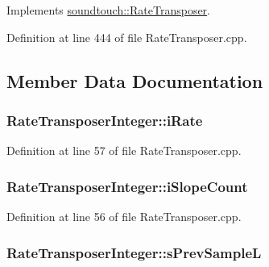 Implements \hyperlink{classsoundtouch_1_1_rate_transposer_a876bc124bc050d06473f58a24e5134d3}{soundtouch\+::\+Rate\+Transposer}.



Definition at line 444 of file Rate\+Transposer.\+cpp.



\subsection{Member Data Documentation}
\subsubsection[{\texorpdfstring{i\+Rate}{iRate}}]{ Rate\+Transposer\+Integer\+::i\+Rate\hspace{0.3cm}{\ttfamily [protected]}}\hypertarget{class_rate_transposer_integer_ad8952aa4ee684d045ba0c45969a5bdcf}{}\label{class_rate_transposer_integer_ad8952aa4ee684d045ba0c45969a5bdcf}


Definition at line 57 of file Rate\+Transposer.\+cpp.

\subsubsection[{\texorpdfstring{i\+Slope\+Count}{iSlopeCount}}]{ Rate\+Transposer\+Integer\+::i\+Slope\+Count\hspace{0.3cm}{\ttfamily [protected]}}\hypertarget{class_rate_transposer_integer_aff8e7ba3728334ab0d0c7c74aa463f7a}{}\label{class_rate_transposer_integer_aff8e7ba3728334ab0d0c7c74aa463f7a}


Definition at line 56 of file Rate\+Transposer.\+cpp.

\subsubsection[{\texorpdfstring{s\+Prev\+SampleL}{sPrevSampleL}}]{ Rate\+Transposer\+Integer\+::s\+Prev\+SampleL\hspace{0.3cm}{\ttfamily [protected]}}\hypertarget{class_rate_transposer_integer_aec25931842437d0c1b6fb753f23d08f2}{}\label{class_rate_transposer_integer_aec25931842437d0c1b6fb753f23d08f2}


